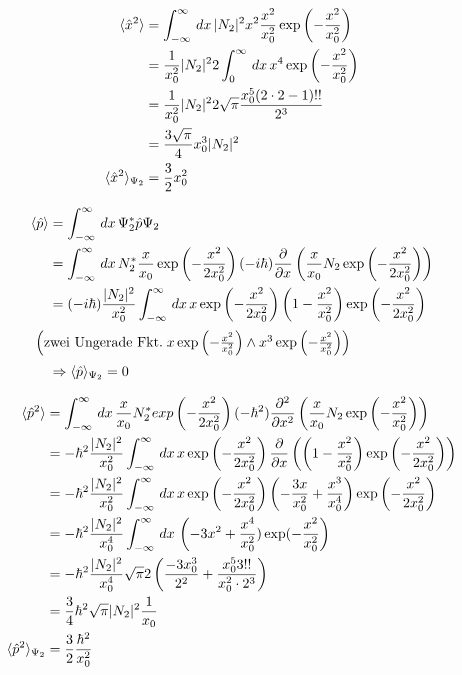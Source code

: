 \begin{align}
    \langle\hat x ^2\rangle &= \int_{-\infty}^{\infty}\,dx\, \lvert N_2\rvert^2 x^2 \frac{x^2}{x_0^2} \exp\left(-\frac{x^2}{x_0^2}\right)\\
    &=\frac{1}{x_0^2} \lvert N_2\rvert^2 2 \int_0^{\infty}\,dx\, x^4 \exp\left(-\frac{x^2}{x_0^2}\right)\\
    &=\frac{1}{x_0^2} \lvert N_2\rvert^2 2\sqrt{\pi} \frac{x_0^5(2\cdot2-1)!!}{2^3}\\
    &=\frac{3\sqrt{\pi}}{4}x_0^3 \lvert N_2\rvert^2\\
    \langle\hat x ^2\rangle_{\Psi _2}&= \frac{3}{2} x_0^2
\end{align}

\begin{align}
    \langle\hat p \rangle &= \int_{-\infty}^{\infty}\,dx\, \Psi _2^*\hat p \Psi _2\\
    &=\int_{-\infty}^{\infty}\,dx\, N_2^* \frac{x}{x_0} \exp\left(-\frac{x^2}{2x_0^2}\right) (-i\hbar) \frac{\partial}{\partial x}\left(\frac{x}{x_0} N_2 \exp \left(-\frac{x^2}{2x_0^2}\right)\right) \\
    &=(-i\hbar) \frac{\lvert N_2\rvert^2}{x_0^2} \int_{-\infty}^{\infty} \,dx\,x\exp\left(-\frac{x^2}{2x_0^2}\right) \left(1-\frac{x^2}{x_0^2}\right)\exp\left(-\frac{x^2}{2x_0^2}\right)\\
    \intertext{
        $\left(\text{zwei Ungerade Fkt.}\; x \exp\left(-\frac{x^2}{x_0^2} \right) \wedge x^3 \exp\left(-\frac{x^2}{x_0^2} \right) \right)$
    }
    &\Rightarrow \langle\hat p \rangle_{\Psi _2}=0
\end{align}

\begin{align}
    \langle\hat p ^2\rangle &= \int_{-\infty}^{\infty}\,dx\, \frac{x}{x_0} N_2^* exp\left(-\frac{x^2}{2x_0^2}\right) (-\hbar^2) \frac{\partial ^2}{\partial x^2}\left(\frac{x}{x_0} N_2 \exp\left(-\frac{x^2}{x_0^2}\right) \right)\\
    &= - \hbar ^2 \frac{\lvert N_2\rvert^2}{x_0^2} \int_{-\infty}^{\infty}\,dx\, x \exp\left(-\frac{x^2}{2x_0^2}\right)\frac{\partial}{\partial x}\left(\left(1-\frac{x^2}{x_0^2}\right)\exp\left(-\frac{x^2}{2x_0^2}\right) \right)\\
    &= - \hbar ^2 \frac{\lvert N_2\rvert^2}{x_0^2} \int_{-\infty}^{\infty}\,dx\, x \exp\left(-\frac{x^2}{2x_0^2}\right)\left(\--\frac{3x}{x_0^2}+\frac{x^3}{x_0^4} \right) \exp\left(-\frac{x^2}{2x_0^2}\right)\\
    &= - \hbar^2 \frac{\lvert N_2\rvert^2}{x_0^4} \int_{-\infty}^{\infty}\,dx\, \left(-3x^2+\frac{x^4}{x_0^2})\exp(-\frac{x^2}{x_0^2}\right)\\
    &= - \hbar^2 \frac{\lvert N_2\rvert^2}{x_0^4} \sqrt{\pi} 2\left(\frac{-3x_0^3}{2^2}+\frac{x_0^5 3!!}{x_0^2\cdot 2^3}\right)\\
    &= \frac{3}{4} \hbar^2 \sqrt{\pi} \lvert N_2\rvert^2 \frac{1}{x_0}\\
    \langle\hat p ^2 \rangle_{\Psi _2}&=\frac{3}{2} \frac{\hbar ^2}{x_0^2}
\end{align}

